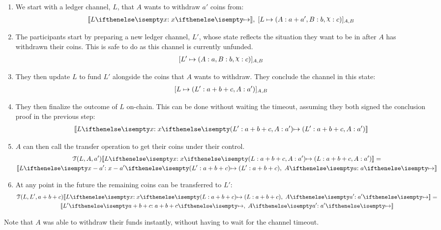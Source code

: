 \begin{enumerate}
  \item We start with a ledger channel, $L$, that $A$ wants to withdraw $a'$ coins from:
  \begin{align}
    \adj{\holds{L}{x}{}}, \; \finalizable{L}{\alloc{A: a + a', B: b, \rchi: c}}{A, B}
  \end{align}
  \item The participants start by preparing a new ledger channel, $L'$, whose state reflects the situation they want to be in after $A$ has withdrawn their coins. This is safe to do as this channel is currently unfunded.
  \begin{align}
    \finalizable{L'}{\alloc{A: a, B:b, \rchi: c}}{A,B}
  \end{align}
  \item They then update $L$ to fund $L'$ alongside the coins that $A$ wants to withdraw. They conclude the channel in this state:
  \begin{align}
    [L \mapsto ( L': a + b + c, A: a' )]_{A,B}
  \end{align}
  \item They then finalize the outcome of $L$ on-chain. This can be done without waiting the timeout, assuming they both signed the conclusion proof in the previous step:
  \begin{align}
    \adj{\holds{L}{x}{\alloc{L': a + b + c, A: a'}}}
  \end{align}
  \item $A$ can then call the transfer operation to get their coins under their control. 
  \begin{multline}
    \transfer{L}{A}{a'}\adj{\holds{L}{x}{\alloc{L: a + b + c, A: a'}}} = \\ \adj{\holds{L}{x - a'}{\alloc{L': a + b + c}}, \; \holds{A}{a}{}}
  \end{multline}
  \item At any point in the future the remaining coins can be transferred to $L'$:
  \begin{multline}
    \transfer{L}{L'}{a + b + c}\adj{\holds{L}{x}{\alloc{L: a + b + c}}, \; \holds{A}{a'}{}} =  \\ \adj{\holds{L'}{a + b + c}{}, \; \holds{A}{a'}{}}
  \end{multline}
\end{enumerate}
Note that $A$ was able to withdraw their funds instantly, without having to wait for the channel timeout.
